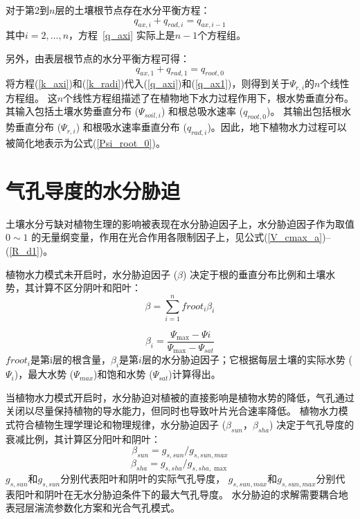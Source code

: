 对于第2到$n$层的土壤根节点存在水分平衡方程：
\begin{equation}\label{q_axi}
q_{a x, i}+q_{r a d, i}=q_{a x, i-1}
\end{equation}
其中$i=2, \ldots, n$，方程~\eqref{q_axi} 实际上是$n-1$个方程组。


另外，由表层根节点的水分平衡方程可得：
\begin{equation}\label{q_ax1}
q_{ax,1}+q_{rad, 1}=q_{root,0}
\end{equation}
将方程(\ref{k_axi})和(\ref{k_radi})代入(\ref{q_axi})和(\ref{q_ax1})，则得到关于$ \Psi_{r,i}$的$n$个线性方程组。
这$n$个线性方程组描述了在植物地下水力过程作用下，根水势垂直分布。其输入包括土壤水势垂直分布 ($\Psi_{soil,i}$) 和根总吸水速率 ($q_{root,0}$)。
其输出包括根水势垂直分布 ($\Psi_{r,i}$) 和根吸水速率垂直分布 ($q_{rad,i}$)。因此，地下植物水力过程可以被简化地表示为公式(\ref{Psi_root_0})。

\section{气孔导度的水分胁迫}\label{气孔导度的水分胁迫}
土壤水分亏缺对植物生理的影响被表现在水分胁迫因子上，水分胁迫因子作为取值 $0\sim 1$ 的无量纲变量，作用在光合作用各限制因子上，见公式(\ref{V_cmax_a})--(\ref{R_d1})。

植物水力模式未开启时，水分胁迫因子 ($\beta$) 决定于根的垂直分布比例和土壤水势，其计算不区分阴叶和阳叶：
\begin{equation}\label{beta_0}
\beta=\sum_{i=1}^{n} froot_i \beta_{i}
\end{equation}

\begin{equation}\label{beta_i}
\beta_{i}=\frac{\Psi_{\max }-\Psi i}{\Psi_{\max }-\Psi_{s a t}}
\end{equation}
$froot_i$是第i层的根含量，$\beta_i$是第$i$层的水分胁迫因子；它根据每层土壤的实际水势 (${\Psi}_i$)，最大水势 (${\Psi}_{max}$)和饱和水势 (${\Psi}_{sat}$)计算得出。

当植物水力模式开启时，水分胁迫对植被的直接影响是植物水势的降低，气孔通过关闭以尽量保持植物的导水能力，但同时也导致叶片光合速率降低。
植物水力模式符合植物生理学理论和物理规律，水分胁迫因子 ($\beta_{sun}$，$\beta_{sha}$) 决定于气孔导度的衰减比例，其计算区分阳叶和阴叶：
\begin{equation}\label{beta_sun}
\beta_{sun}=g_{s,sun} / g_{s,sun,max }
\end{equation}
\begin{equation}\label{beta_sha}
\beta_{sha}=g_{s,sha} / g_{s,sha, \max }
\end{equation}
$g_{s,sun}$和$g_{s,sun}$分别代表阳叶和阴叶的实际气孔导度，
$g_{s,sun,max}$和$g_{s,sun,max}$分别代表阳叶和阴叶在无水分胁迫条件下的最大气孔导度。
水分胁迫的求解需要耦合地表冠层湍流参数化方案和光合气孔模式。


